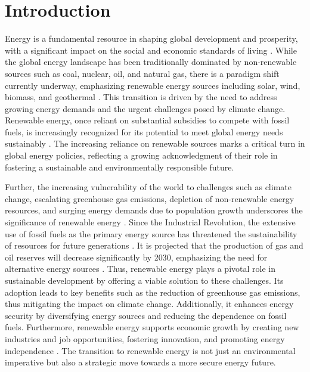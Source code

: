 \documentclass[a4paper,11pt]{article}
\begin{document}
\section{Introduction}
Energy is a fundamental resource in shaping global development and prosperity, with a significant impact on the social and economic standards of living \parencite{ref4,ref44}.
While the global energy landscape has been traditionally dominated by non-renewable sources such as coal, nuclear, oil, and natural gas, there is a paradigm shift currently underway, emphasizing renewable energy sources including solar, wind, biomass, and geothermal \parencite{ref8}.
This transition is driven by the need to address growing energy demands and the urgent challenges posed by climate change. Renewable energy, once reliant on substantial subsidies to compete with fossil fuels, is increasingly recognized for its potential to meet global energy needs sustainably \textcite{ref19}.
The increasing reliance on renewable sources marks a critical turn in global energy policies, reflecting a growing acknowledgment of their role in fostering a sustainable and environmentally responsible future.

Further, the increasing vulnerability of the world to challenges such as climate change, escalating greenhouse gas emissions, depletion of non-renewable energy resources, and surging energy demands due to population growth underscores the significance of renewable energy \parencite{ref2,ref12,ref19}.
Since the Industrial Revolution, the extensive use of fossil fuels as the primary energy source has threatened the sustainability of resources for future generations \parencite{ref2}.
It is projected that the production of gas and oil reserves will decrease significantly by 2030, emphasizing the need for alternative energy sources \parencite{ref2,ref19,ref23}.
Thus, renewable energy plays a pivotal role in sustainable development by offering a viable solution to these challenges. Its adoption leads to key benefits such as the reduction of greenhouse gas emissions, thus mitigating the impact on climate change.
Additionally, it enhances energy security by diversifying energy sources and reducing the dependence on fossil fuels. Furthermore, renewable energy supports economic growth by creating new industries and job opportunities, fostering innovation, and promoting energy independence \parencite{ref19}.
The transition to renewable energy is not just an environmental imperative but also a strategic move towards a more secure energy future.
\end{document}
